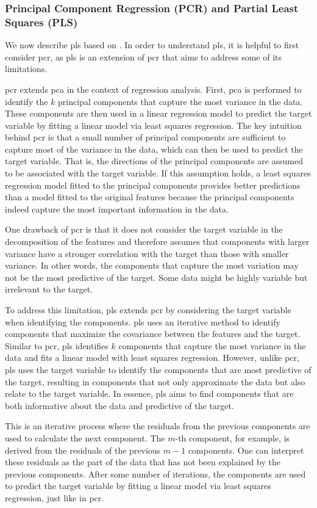 \subsubsection{Principal Component Regression (PCR) and Partial Least Squares (PLS)}\label{subsec:pls}
We now describe \gls{pls} based on \citet{James2023AnIS}.
In order to understand \gls{pls}, it is helpful to first consider \gls{pcr}, as \gls{pls} is an extension of \gls{pcr} that aims to address some of its limitations.

\gls{pcr} extends \gls{pca} in the context of regression analysis.
First, \gls{pca} is performed to identify the $k$ principal components that capture the most variance in the data.
These components are then used in a linear regression model to predict the target variable by fitting a linear model via least squares regression.
The key intuition behind \gls{pcr} is that a small number of principal components are sufficient to capture most of the variance in the data, which can then be used to predict the target variable.
That is, the directions of the principal components are assumed to be associated with the target variable.
If this assumption holds, a least squares regression model fitted to the principal components provides better predictions than a model fitted to the original features because the principal components indeed capture the most important information in the data.

One drawback of \gls{pcr} is that it does not consider the target variable in the decomposition of the features and therefore assumes that components with larger variance have a stronger correlation with the target than those with smaller variance. In other words, the components that capture the most variation may not be the most predictive of the target. Some data might be highly variable but irrelevant to the target.

To address this limitation, \gls{pls} extends \gls{pcr} by considering the target variable when identifying the components.
\gls{pls} uses an iterative method to identify components that maximize the covariance between the features and the target.
Similar to \gls{pcr}, \gls{pls} identifies $k$ components that capture the most variance in the data and fits a linear model with least squares regression.
However, unlike \gls{pcr}, \gls{pls} uses the target variable to identify the components that are most predictive of the target, resulting in components that not only approximate the data but also relate to the target variable.
In essence, \gls{pls} aims to find components that are both informative about the data and predictive of the target.

This is an iterative process where the residuals from the previous components are used to calculate the next component.
The $m$-th component, for example, is derived from the residuals of the previous $m-1$ components.
One can interpret these residuals as the part of the data that has not been explained by the previous components.
After some number of iterations, the components are used to predict the target variable by fitting a linear model via least squares regression, just like in \gls{pcr}.